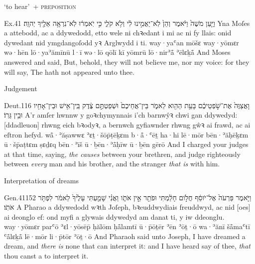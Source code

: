 \begin{frame}{\ex {} ‘to hear’~+ \textsc{preposition}}
	\begin{example}{Ex.}{4}{1}{}{}
		\quoling
		{וַיַּ֤עַן מֹשֶׁה֙ וַיֹּ֔אמֶר וְהֵן֙ לֹֽא־יַאֲמִ֣ינוּ לִ֔י וְלֹ֥א  קֹלִ֑י כִּ֣י יֹֽאמְר֔וּ לֹֽא־נִרְאָ֥ה אֵלֶ֖יךָ יְהוָֽה׃}
		{Yna Moſes a attebodd, ac a ddywedodd, etto wele ni chꝛedant i mi ac ni   fy llais: onid dywedant nid ymgdangoſodd yꝛ Arglwydd i ti.}
		{way·yaʿan mōšɛ way·yōmɛr wə·hēn lō·yaʾămīnū l·ī wə·lō  qōlī kī yōmrū lō·nirʾå̄ ʾēlɛḵå̄ {\YHWH}}
		{And Moses answered and said, But, behold, they will not believe me, nor   my voice: for they will say, The {\LORD} hath not appeared unto thee.}
	\end{example}
\end{frame}



\begin{frame}{\ex Judgement}
	\begin{example}{Deut.}{1}{16}{}{}
		\quoling
		{וָאֲצַוֶּה֙ אֶת־שֹׁ֣פְטֵיכֶ֔ם בָּעֵ֥ת הַהִ֖וא לֵאמֹ֑ר  בֵּין־אֲחֵיכֶם֙ וּשְׁפַטְתֶּ֣ם צֶ֔דֶק בֵּֽין־אִ֥ישׁ וּבֵין־אָחִ֖יו וּבֵ֥ין גֵּרֽוֹ׃}
		{A’r amſer hwnnw y goꝛchymynnais i’ch barnwŷꝛ chwi gan ddywedyd:  [ddadleuon] rhwng eich bꝛodyꝛ, a bernwch gyfiawnder rhwng gŵꝛ ai frawd, ac ai eſtron hefyd.}
		{wå̄·ʾăṣawwɛ ʾɛṯ·šōp̄ṭēḵɛm b·å̄·ʿēṯ ha·hi lē·mōr  bēn·ʾăḥēḵɛm ū·šp̄aṭtɛm ṣɛḏɛq bēn·ʾīš ū·ḇēn·ʾå̄ḥīw ū·ḇēn gērō}
		{And I charged your judges at that time, saying,  \emph{the causes} between your brethren, and judge righteously between \emph{every} man and his brother, and the stranger \emph{that is} with him.}
	\end{example}
\end{frame}


\begin{frame}{\ex Interpretation of dreams}
	\begin{example}{Gen.}{41}{15}{2}{}
		\quoling
		{וַיֹּ֤אמֶר פַּרְעֹה֙ אֶל־יֹוסֵ֔ף חֲלֹ֣ום חָלַ֔מְתִּי וּפֹתֵ֖ר אֵ֣ין אֹתֹ֑ו וַאֲנִ֗י שָׁמַ֤עְתִּי עָלֶ֙יךָ֙ לֵאמֹ֔ר   לִפְתֹּ֥ר אֹתֹֽו׃}
		{A Pharao a ddywedodd wꝛth Joſeph, bꝛeuddwydiais freuddwyd, ac nid [oes] ai deonglo ef: ond myfi a glywais ddywedyd am danat ti, y   iw ddeonglu.}
		{way·yōmɛr parʿō ʾɛl·yōsēp̄ ḥălōm ḥå̄lamtī ū·p̄ōṯēr ʾēn ʾōṯ·ō wa·ʾănī šå̄maʿtī ʿå̄lɛḵå̄ lē·mōr   li·p̄tōr ʾōṯ·ō}
		{And Pharaoh said unto Joseph, I have dreamed a dream, and \textit{there is} none that can interpret it: and I have heard say of thee, \textit{that} thou canst  a  to interpret it.}
	\end{example}
\end{frame}



